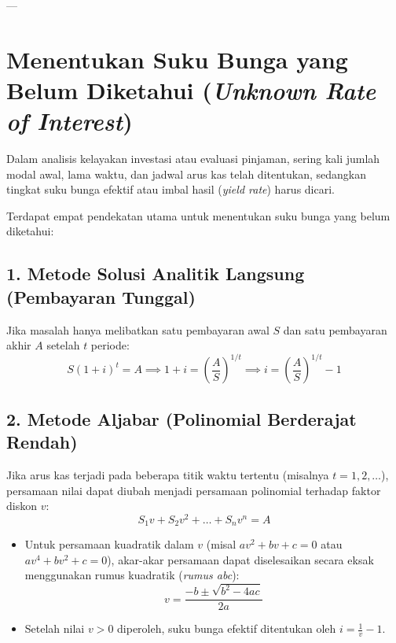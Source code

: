 \documentclass[11pt,a4paper]{article}
\begin{document}
---

\section{Menentukan Suku Bunga yang Belum Diketahui (\textit{Unknown Rate of Interest})}

Dalam analisis kelayakan investasi atau evaluasi pinjaman, sering kali jumlah modal awal, lama waktu, dan jadwal arus kas telah ditentukan, sedangkan tingkat suku bunga efektif atau imbal hasil (\textit{yield rate}) harus dicari.

Terdapat empat pendekatan utama untuk menentukan suku bunga yang belum diketahui:

\subsection{1. Metode Solusi Analitik Langsung (Pembayaran Tunggal)}
Jika masalah hanya melibatkan satu pembayaran awal $S$ dan satu pembayaran akhir $A$ setelah $t$ periode:
\begin{equation}
    S(1 + i)^t = A \implies 1 + i = \left(\frac{A}{S}\right)^{1/t} \implies i = \left(\frac{A}{S}\right)^{1/t} - 1
\end{equation}

\subsection{2. Metode Aljabar (Polinomial Berderajat Rendah)}
Jika arus kas terjadi pada beberapa titik waktu tertentu (misalnya $t = 1, 2, \dots$), persamaan nilai dapat diubah menjadi persamaan polinomial terhadap faktor diskon $v$:
\begin{equation}
    S_1 v + S_2 v^2 + \dots + S_n v^n = A
\end{equation}
\begin{itemize}[leftmargin=1.5em]
    \item Untuk persamaan kuadratik dalam $v$ (misal $a v^2 + b v + c = 0$ atau $a v^4 + b v^2 + c = 0$), akar-akar persamaan dapat diselesaikan secara eksak menggunakan rumus kuadratik (\textit{rumus abc}):
    \begin{equation}
        v = \frac{-b \pm \sqrt{b^2 - 4ac}}{2a}
    \end{equation}
    \item Setelah nilai $v > 0$ diperoleh, suku bunga efektif ditentukan oleh $i = \frac{1}{v} - 1$.
\end{itemize}
\end{document}
